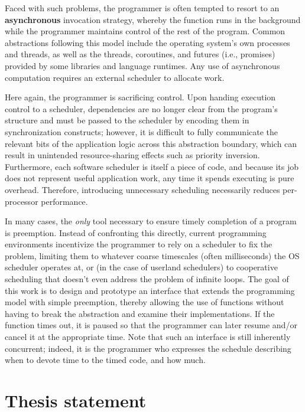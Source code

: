 \documentclass[12pt,letterpaper,openright]{report}
\begin{document}
Faced with such problems, the programmer is often tempted to resort to an
\textbf{asynchronous} invocation strategy, whereby the function runs in the
background while the programmer maintains control of the rest of the program.  Common
abstractions following this model include the operating system's own processes and
threads, as well as the threads, coroutines, and futures (i.e., promises) provided by
some libraries and language runtimes.  Any use of asynchronous computation requires
an external scheduler to allocate work.

Here again, the programmer is sacrificing control.  Upon handing execution control to
a scheduler, dependencies are no longer clear from the program's structure and must
be passed to the scheduler by encoding them in synchronization constructs; however,
it is difficult to fully communicate the relevant bits of the application logic
across this abstraction boundary, which can result in unintended resource-sharing
effects such as priority inversion.  Furthermore, each software scheduler is itself a
piece of code, and because its job does not represent useful application work, any
time it spends executing is pure overhead.  Therefore, introducing unnecessary
scheduling necessarily reduces per-processor performance.

In many cases, the \textit{only} tool necessary to ensure timely completion of a
program is preemption.  Instead of confronting this directly, current programming
environments incentivize the programmer to rely on a scheduler to fix the problem,
limiting them to whatever coarse timescales (often milliseconds) the OS scheduler
operates at, or (in the case of userland schedulers) to cooperative scheduling
that doesn't even address the problem of infinite loops.  The goal of this work is to
design and prototype an interface that extends the programming model with simple
preemption, thereby allowing the use of functions without having to break the
abstraction and examine their implementations.  If the function times out, it is
paused so that the programmer can later resume and/or cancel it at the appropriate
time.  Note that such an interface is still inherently concurrent; indeed, it is the
programmer who expresses the schedule describing when to devote time to the timed
code, and how much.


\section{Thesis statement}
\end{document}
